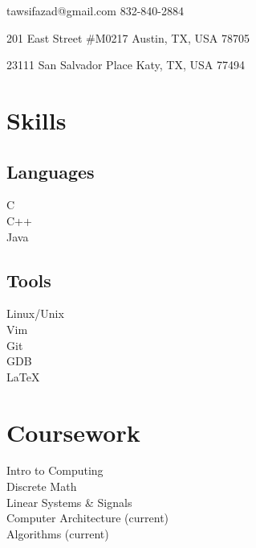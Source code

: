 \documentclass{cv_class}
\begin{document}
%
%
\begin{center}%
\contact
    {tawsifazad@gmail.com}%
    {832-840-2884}%

\address
    {Local}%
    {201 East  Street \#M0217}%
    {Austin, TX, USA}%
    {78705}%

\address
    {Permanent}%
    {23111 San Salvador Place}%
    {Katy, TX, USA}%
    {77494}%
\end{center}%
\begin{twocols}%
\section{Skills}%
\subsection{Languages}%
C\\
C++\\
Java\\
\hfill
\subsection{Tools}%
Linux/Unix\\
Vim\\
Git\\
GDB\\
\LaTeX\\
\hfill
\section{Coursework}%
Intro to Computing\\
Discrete Math\\
Linear Systems \& Signals\\
Computer Architecture (current)\\
Algorithms (current)\\
\colsep

\end{twocols}
\end{document}
